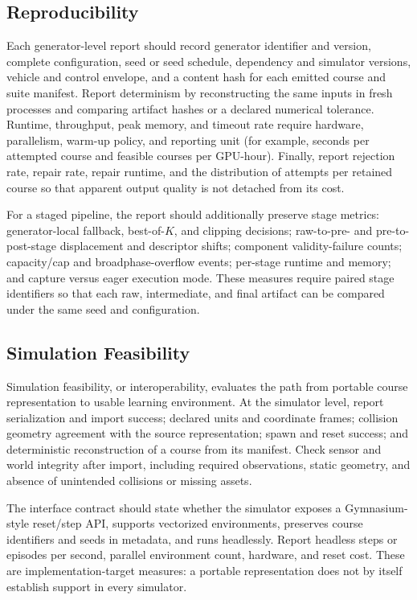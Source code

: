 \subsection{Reproducibility}

Each generator-level report should record generator identifier and version, complete
configuration, seed or seed schedule, dependency and simulator versions, vehicle and
control envelope, and a content hash for each emitted course and suite manifest.
Report determinism by reconstructing the same inputs in fresh processes and comparing
artifact hashes or a declared numerical tolerance. Runtime, throughput, peak memory,
and timeout rate require hardware, parallelism, warm-up policy, and reporting unit
(for example, seconds per attempted course and feasible courses per GPU-hour).
Finally, report rejection rate, repair rate, repair runtime, and the distribution of
attempts per retained course so that apparent output quality is not detached from its
cost.

For a staged pipeline, the report should additionally preserve stage metrics:
generator-local fallback, best-of-$K$, and clipping decisions; raw-to-pre- and
pre-to-post-stage displacement and descriptor shifts; component validity-failure
counts; capacity/cap and broadphase-overflow events; per-stage runtime and memory;
and capture versus eager execution mode.  These measures require paired stage
identifiers so that each raw, intermediate, and final artifact can be compared under
the same seed and configuration.

\subsection{Simulation Feasibility}

Simulation feasibility, or interoperability, evaluates the path from portable course
representation to usable learning environment. At the simulator level, report
serialization and import success; declared units and coordinate frames; collision
geometry agreement with the source representation; spawn and reset success; and
deterministic reconstruction of a course from its manifest. Check sensor and world
integrity after import, including required observations, static geometry, and absence
of unintended collisions or missing assets.

The interface contract should state whether the simulator exposes a Gymnasium-style
reset/step API, supports vectorized environments, preserves course identifiers and
seeds in metadata, and runs headlessly. Report headless steps or episodes per second,
parallel environment count, hardware, and reset cost. These are implementation-target
measures: a portable representation does not by itself establish support in every
simulator.

